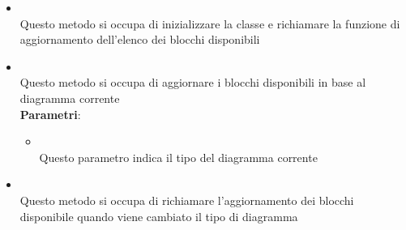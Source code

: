 \begin{itemize}
\begin{itemize}
\begin{itemize}
\end{itemize}
\item {}
\\ Questo metodo si occupa di inizializzare la classe e richiamare la funzione di aggiornamento dell'elenco dei blocchi disponibili
\item {}
\\ Questo metodo si occupa di aggiornare i blocchi disponibili in base al diagramma corrente
\\ \textbf{Parametri}:
\begin{itemize}
\item {}
\\ Questo parametro indica il tipo del diagramma corrente
\end{itemize}
\item {}
\\ Questo metodo si occupa di richiamare l'aggiornamento dei blocchi disponibile quando viene cambiato il tipo di diagramma
\end{itemize}
\end{itemize}

